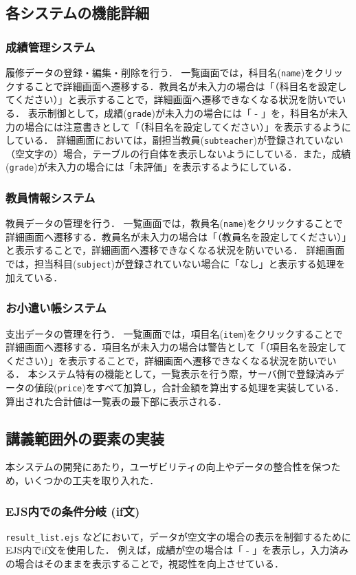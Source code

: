 \subsection{各システムの機能詳細}
\subsubsection{成績管理システム}
履修データの登録・編集・削除を行う．
一覧画面では，科目名(\texttt{name})をクリックすることで詳細画面へ遷移する．教員名が未入力の場合は「（科目名を設定してください）」と表示することで，詳細画面へ遷移できなくなる状況を防いでいる．
表示制御として，成績(\texttt{grade})が未入力の場合には「 - 」を，科目名が未入力の場合には注意書きとして「（科目名を設定してください）」を表示するようにしている．
詳細画面においては，副担当教員(\texttt{subteacher})が登録されていない（空文字の）場合，テーブルの行自体を表示しないようにしている．また，成績(\texttt{grade})が未入力の場合には「未評価」を表示するようにしている．

\subsubsection{教員情報システム}
教員データの管理を行う．
一覧画面では，教員名(\texttt{name})をクリックすることで詳細画面へ遷移する．教員名が未入力の場合は「（教員名を設定してください）」と表示することで，詳細画面へ遷移できなくなる状況を防いでいる．
詳細画面では，担当科目(\texttt{subject})が登録されていない場合に「なし」と表示する処理を加えている．

\subsubsection{お小遣い帳システム}
支出データの管理を行う．
一覧画面では，項目名(\texttt{item})をクリックすることで詳細画面へ遷移する．項目名が未入力の場合は警告として「（項目名を設定してください）」を表示することで，詳細画面へ遷移できなくなる状況を防いでいる．
本システム特有の機能として，一覧表示を行う際，サーバ側で登録済みデータの値段(\texttt{price})をすべて加算し，合計金額を算出する処理を実装している．算出された合計値は一覧表の最下部に表示される．

\subsection{講義範囲外の要素の実装}
本システムの開発にあたり，ユーザビリティの向上やデータの整合性を保つため，いくつかの工夫を取り入れた．

\subsubsection{EJS内での条件分岐 (if文)}
\texttt{result\_list.ejs} などにおいて，データが空文字の場合の表示を制御するためにEJS内でif文を使用した．
例えば，成績が空の場合は「 - 」を表示し，入力済みの場合はそのままを表示することで，視認性を向上させている．

